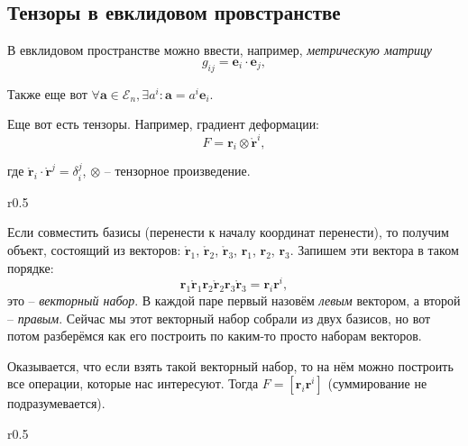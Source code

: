 \subsection{Тензоры в евклидовом провстранстве}
В евклидовом пространстве можно ввести, например, \emph{метрическую
матрицу}
\[
  g_{ij} = \mathbf{e}_i \cdot \mathbf{e}_j,
\]

Также еще вот $\forall \mathbf{a} \in \mathcal{E}_n, \exists a^i :  \mathbf{a} = a^i \mathbf{e}_i$.

Еще вот есть тензоры. Например, градиент деформации:
\[
  F = \mathbf{r}_i \otimes \mathring{\mathbf{r}}^i,
\]

\begin{figure}[H]
	\centering
	
\end{figure}
где $\mathring{\mathbf{r}}_i \cdot \mathring{\mathbf{r}}^j = \delta_i^j$,
  $\otimes$ -- тензорное произведение.
  

\begin{wrapfigure}{r}{0.5\textwidth}
	\centering
	
\end{wrapfigure}

Если совместить базисы (перенести к началу координат перенести), то получим объект, состоящий
из векторов: $\mathring{\mathbf{r}}_1$, $\mathring{\mathbf{r}}_2$, $\mathring{\mathbf{r}}_3$, $\mathbf{r}_1$,
$\mathbf{r}_2$, $\mathbf{r}_3$. Запишем эти вектора в таком порядке:
\[
  \mathbf{r}_1 \mathring{\mathbf{r}}_1 \mathbf{r}_2 \mathring{\mathbf{r}}_2 \mathbf{r}_3 \mathring{\mathbf{r}}_3 = \mathbf{r}_i \mathbf{r}^i,
\]
это -- \emph{векторный набор}. В каждой паре первый назовём \emph{левым} вектором, а
второй -- \emph{правым}. Сейчас мы этот векторный набор собрали из двух базисов, но вот потом
разберёмся как его построить по каким-то просто наборам векторов. 

%	

Оказывается, что если взять такой векторный набор, то на нём можно построить все операции, которые
нас интересуют. Тогда $F = [\mathbf{r}_i \mathbf{r}^i]$ (суммирование не подразумевается).

\begin{wrapfigure}{r}{0.5\textwidth}
	\centering
	
\end{wrapfigure}

